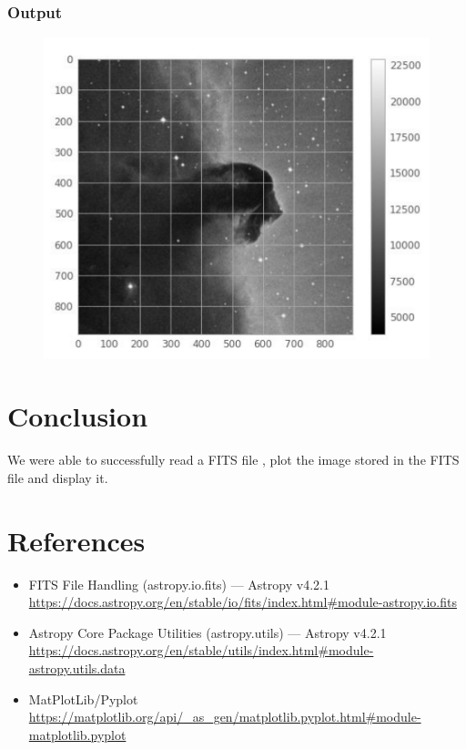 \documentclass[letterpaper,11pt]{report}
\begin{document}
\subsubsection{Output}
\begin{figure}[H]
    \centering
    \includegraphics[scale = 0.5]{horsey.png}
    \caption{}
    \label{fig:my_label}
\end{figure}

\section{Conclusion}
 We were able to successfully read a FITS file , plot the image stored in the FITS file and display it.
 
\section{References}
\begin{itemize}
    \item FITS File Handling (astropy.io.fits) — Astropy v4.2.1 \\ \href{https://docs.astropy.org/en/stable/io/fits/index.html#module-astropy.io.fits}{https://docs.astropy.org/en/stable/io/fits/index.html#module-astropy.io.fits}
    \item Astropy Core Package Utilities (astropy.utils) — Astropy v4.2.1 \\
    \href{https://docs.astropy.org/en/stable/utils/index.html#module-astropy.utils.data}{https://docs.astropy.org/en/stable/utils/index.html#module-astropy.utils.data}
    \item MatPlotLib/Pyplot \\ \href{https://matplotlib.org/api/_as_gen/matplotlib.pyplot.html#module-matplotlib.pyplot}{https://matplotlib.org/api/_as_gen/matplotlib.pyplot.html#module-matplotlib.pyplot}
\end{itemize}
\end{document}

